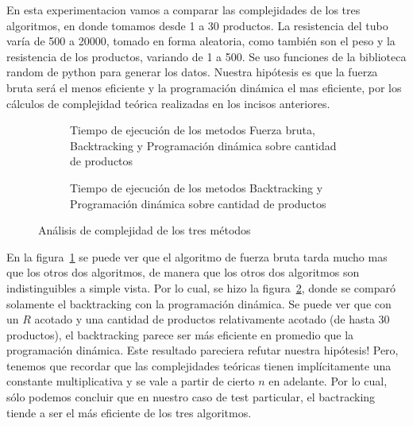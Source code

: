 \documentclass[10pt,a4paper]{article}
\begin{document}
En esta experimentacion vamos a comparar las complejidades de los tres algoritmos, en donde tomamos desde 1 a 30 productos. La resistencia del tubo var\'ia de 500 a 20000, tomado en forma aleatoria, como tambi\'en son el peso y la resistencia de los productos, variando de 1 a 500. Se uso funciones de la biblioteca random de python para generar los datos. Nuestra hip\'otesis es que la fuerza bruta ser\'a el menos eficiente y la programaci\'on din\'amica el mas eficiente, por los c\'alculos de complejidad te\'orica realizadas en los incisos anteriores.

    \begin{figure}[!ht]
        \centering
        \begin{subfigure}{0.45\linewidth}
            \centering
            
            \caption{Tiempo de ejecución de los metodos Fuerza bruta, Backtracking y Programaci\'on din\'amica sobre cantidad de productos}
            \label{fig:comparacion-bt-fb-dp}
        \end{subfigure}
        \begin{subfigure}{0.45\linewidth}
            \centering
            
            \caption{Tiempo de ejecución de los metodos Backtracking y Programaci\'on din\'amica sobre cantidad de productos}
            \label{fig:comparacion-bt-dp}
        \end{subfigure}
    \caption{Análisis de complejidad de los tres m\'etodos}
    \label{fig:bt-fb-dp-complejidad}
    \end{figure}
    
En la figura~\ref{fig:comparacion-bt-fb-dp} se puede ver que el algoritmo de fuerza bruta tarda mucho mas que los otros dos algoritmos, de manera que los otros dos algoritmos son indistinguibles a simple vista. Por lo cual, se hizo la figura~\ref{fig:comparacion-bt-dp}, donde se compar\'o solamente el backtracking con la programaci\'on din\'amica. Se puede ver que con un $R$ acotado y una cantidad de productos relativamente acotado (de hasta 30 productos), el backtracking parece ser m\'as eficiente en promedio que la programaci\'on din\'amica. Este resultado pareciera refutar nuestra hip\'otesis! Pero, tenemos que recordar que las complejidades te\'oricas tienen impl\'icitamente una constante multiplicativa y se vale a partir de cierto $n$ en adelante. Por lo cual, s\'olo podemos concluir que en nuestro caso de test particular, el bactracking tiende a ser el m\'as eficiente de los tres algoritmos.
\end{document}

